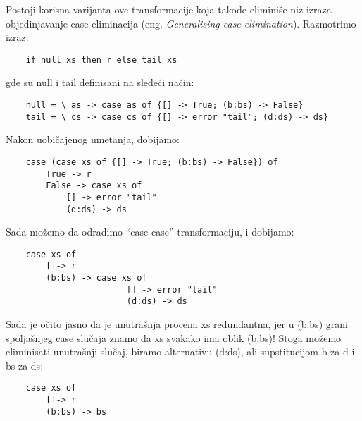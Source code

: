 Postoji korisna varijanta ove transformacije koja takođe eliminiše niz izraza - objedinjavanje case eliminacija (eng. \emph{Generalising case elimination}). Razmotrimo izraz:
\begin{verbatim}
	if null xs then r else tail xs
\end{verbatim}
gde su null i tail definisani na sledeći način:
\begin{verbatim}
	null = \ as -> case as of {[] -> True; (b:bs) -> False}
	tail = \ cs -> case cs of {[] -> error "tail"; (d:ds) -> ds}
\end{verbatim}
Nakon uobičajenog umetanja, dobijamo:
\begin{verbatim}
	case (case xs of {[] -> True; (b:bs) -> False}) of
		True -> r
		False -> case xs of
			[] -> error "tail"
			(d:ds) -> ds
\end{verbatim}
Sada možemo da odradimo “case-case” transformaciju, i dobijamo:
\begin{verbatim}
	case xs of
		[]-> r
		(b:bs) -> case xs of
						[] -> error "tail"
						(d:ds) -> ds
\end{verbatim}
Sada je očito jasno da je unutrašnja procena xs redundantna, jer u (b:bs) grani spoljašnjeg case slučaja znamo da xs svakako ima 
oblik (b:bs)! Stoga možemo eliminisati unutrašnji slučaj, biramo alternativu (d:ds), ali supstitucijom b za d i bs za ds: 
\begin{verbatim}
	case xs of
		[]-> r
		(b:bs) -> bs
\end{verbatim}

